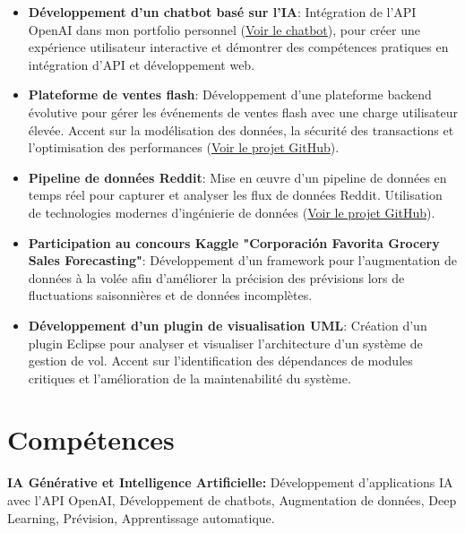 \documentclass[10pt, letterpaper]{article}
\begin{document}
\begin{itemize}[leftmargin=*]
\item \textbf{Développement d'un chatbot basé sur l'IA}:  
Intégration de l'API OpenAI dans mon portfolio personnel (\href{https://personal-portfolio-mohamedayadidat.replit.app/chat}{Voir le chatbot}), pour créer une expérience utilisateur interactive et démontrer des compétences pratiques en intégration d'API et développement web.

\item \textbf{Plateforme de ventes flash}:  
Développement d'une plateforme backend évolutive pour gérer les événements de ventes flash avec une charge utilisateur élevée. Accent sur la modélisation des données, la sécurité des transactions et l'optimisation des performances (\href{https://github.com/Mayedi007/flash-sale-platform}{Voir le projet GitHub}).

\item \textbf{Pipeline de données Reddit}:  
Mise en œuvre d'un pipeline de données en temps réel pour capturer et analyser les flux de données Reddit. Utilisation de technologies modernes d'ingénierie de données (\href{https://github.com/Mayedi007/reddit-data-streaming-pipeline}{Voir le projet GitHub}).

\item \textbf{Participation au concours Kaggle "Corporación Favorita Grocery Sales Forecasting"}:  
Développement d'un framework pour l'augmentation de données à la volée afin d'améliorer la précision des prévisions lors de fluctuations saisonnières et de données incomplètes.

\item \textbf{Développement d'un plugin de visualisation UML}:  
Création d'un plugin Eclipse pour analyser et visualiser l'architecture d'un système de gestion de vol. Accent sur l'identification des dépendances de modules critiques et l'amélioration de la maintenabilité du système.
\end{itemize}

\vspace{0.2 cm}

\section{Compétences}

\textbf{IA Générative et Intelligence Artificielle:}  
Développement d'applications IA avec l'API OpenAI, Développement de chatbots, Augmentation de données, Deep Learning, Prévision, Apprentissage automatique.
\end{document}
